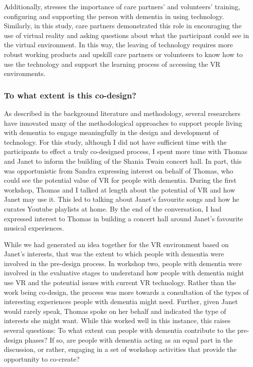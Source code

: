 Additionally, \cite{hwang2020exploring} stresses the importance of care partners' and volunteers' training, configuring and supporting the person with dementia in using technology. Similarly, in this study, care partners demonstrated this role in encouraging the use of virtual reality and asking questions about what the participant could see in the virtual environment. In this way, the leaving of technology requires more robust working products and upskill care partners or volunteers to know how to use the technology and support the learning process of accessing the VR environments. 

\subsubsection{To what extent is this co-design?}
\label{WhatExtentCo-design}
As described in the background literature and methodology, several researchers have innovated many of the methodological approaches to support people living with dementia to engage meaningfully in the design and development of technology. For this study, although I did not have sufficient time with the participants to effect a truly co-designed process, I spent more time with Thomas and Janet to inform the building of the Shania Twain concert hall. In part, this was opportunistic from Sandra expressing interest on behalf of Thomas, who could see the potential value of VR for people with dementia. During the first workshop, Thomas and I talked at length about the potential of VR and how Janet may use it. This led to talking about Janet's favourite songs and how he curates Youtube playlists at home. By the end of the conversation, I had expressed interest to Thomas in building a concert hall around Janet's favourite musical experiences.

While we had generated an idea together for the VR environment based on Janet's interests, that was the extent to which people with dementia were involved in the pre-design process. In workshop two, people with dementia were involved in the evaluative stages to understand how people with dementia might use VR and the potential issues with current VR technology. Rather than the work being co-design, the process was more towards a consultation of the types of interesting experiences people with dementia might need. Further, given Janet would rarely speak, Thomas spoke on her behalf and indicated the type of interests she might want. While this worked well in this instance, this raises several questions: To what extent can people with dementia contribute to the pre-design phases? If so, are people with dementia acting as an equal part in the discussion, or rather, engaging in a set of workshop activities that provide the opportunity to co-create? \citep{tsekleves2020engaging}

